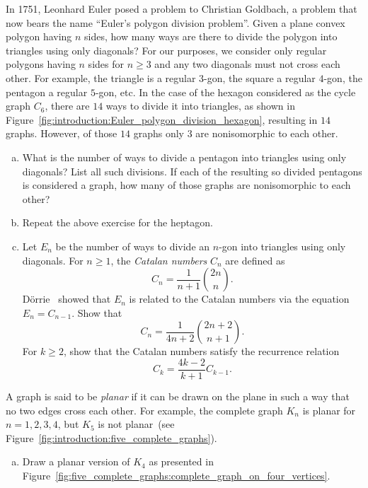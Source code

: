 \begin{problem}
\item\label{prob:introduction:Euler_polygon_division}
  In 1751, Leonhard Euler posed a problem
  to Christian Goldbach, a problem that now
  bears the name ``Euler's polygon division
  problem''. Given a
  plane convex polygon having $n$ sides, how many ways are there to
  divide the polygon into triangles using only diagonals? For our
  purposes, we consider only regular polygons having $n$ sides for
  $n \geq 3$ and any two diagonals must not cross each other. For
  example, the triangle is a regular $3$-gon, the square a regular
  $4$-gon, the pentagon a regular $5$-gon, etc. In the case of the
  hexagon considered as the cycle graph $C_6$, there are $14$ ways to
  divide it into triangles, as shown in
  Figure~\ref{fig:introduction:Euler_polygon_division_hexagon},
  resulting in $14$ graphs. However, of those $14$ graphs only $3$ are
  nonisomorphic to each other.
  \begin{enumerate}[(a)]
  \item What is the number of ways to
    divide a pentagon
    into triangles using only diagonals? List all such divisions. If
    each of the resulting so divided pentagons is considered a graph,
    how many of those graphs are
    nonisomorphic to each other?

  \item Repeat the above exercise for the
    heptagon.

  \item Let $E_n$ be the number of ways to
    divide an $n$-gon
    into triangles using only diagonals. For $n \geq 1$, the
    \emph{Catalan numbers} $C_n$ are defined as
    \[
    C_n
    =
    \frac{1}{n+1} \binom{2n}{n}.
    \]
    D\"orrie~\cite[pp.21--27]{Dorrie1965}
    showed that $E_n$ is related to the Catalan
    numbers via the equation $E_n = C_{n-1}$. Show that
    \[
    C_n
    =
    \frac{1}{4n + 2} \binom{2n + 2}{n + 1}.
    \]
    For $k \geq 2$, show that the Catalan
    numbers satisfy the recurrence relation
    \[
    C_k
    =
    \frac{4k - 2}{k + 1} C_{k-1}.
    \]
  \end{enumerate}

\item A graph is said to be \emph{planar} if it
  can be drawn on the plane in such a way that no two edges cross each
  other. For example, the complete graph $K_n$ is planar for
  $n = 1, 2, 3, 4$, but $K_5$ is not planar~(see
  Figure~\ref{fig:introduction:five_complete_graphs}).
  \begin{enumerate}[(a)]
  \item Draw a planar version of $K_4$ as presented in
    Figure~\ref{fig:five_complete_graphs:complete_graph_on_four_vertices}.


\end{enumerate}
\end{problem}
